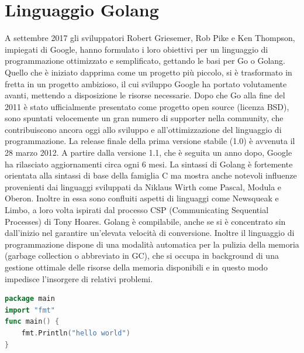 \section{Linguaggio Golang}
A settembre 2017 gli sviluppatori Robert Griesemer, Rob Pike e Ken Thompson, impiegati di Google, hanno formulato i loro obiettivi per un linguaggio di programmazione ottimizzato e semplificato, gettando le basi per Go o Golang. Quello che è iniziato dapprima come un progetto più piccolo, si è trasformato in fretta in un progetto ambizioso, il cui sviluppo Google ha portato volutamente avanti, mettendo a disposizione le risorse necessarie.
Dopo che Go alla fine del 2011 è stato ufficialmente presentato come progetto open source (licenza BSD), sono spuntati velocemente un gran numero di supporter nella community, che contribuiscono ancora oggi allo sviluppo e all’ottimizzazione del linguaggio di programmazione. La release finale della prima versione stabile (1.0) è avvenuta il 28 marzo 2012. A partire dalla versione 1.1, che è seguita un anno dopo, Google ha rilasciato aggiornamenti circa ogni 6 mesi.
La sintassi di Golang è fortemente orientata alla sintassi di base della famiglia C ma mostra anche notevoli influenze provenienti dai linguaggi sviluppati da Niklaus Wirth come Pascal, Modula e Oberon. Inoltre in essa sono confluiti aspetti di linguaggi come Newsqueak e Limbo, a loro volta ispirati dal processo CSP (Communicating Sequential Processes) di Tony Hoares.
Golang è compilabile, anche se si è concentrato sin dall’inizio nel garantire un’elevata velocità di conversione. Inoltre il linguaggio di programmazione dispone di una modalità automatica per la pulizia della memoria (garbage collection o abbreviato in GC), che si occupa in background di una gestione ottimale delle risorse della memoria disponibili e in questo modo impedisce l’insorgere di relativi problemi.
\begin{lstlisting}[language=Go]
package main
import "fmt"
func main() {
    fmt.Println("hello world")
}
\end{lstlisting}
